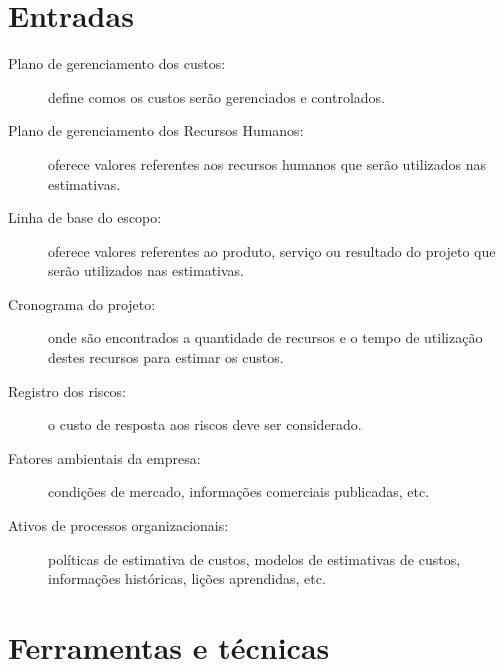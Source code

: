 \section{Entradas}

\begin{description}

	\item[Plano de gerenciamento dos custos:] define comos os custos serão gerenciados e controlados.

	\item[Plano de gerenciamento dos Recursos Humanos:] oferece valores referentes aos recursos humanos que serão utilizados nas estimativas.

	\item[Linha de base do escopo:] oferece valores referentes ao produto, serviço ou resultado do projeto que serão utilizados nas estimativas.

	\item[Cronograma do projeto:] onde são encontrados a quantidade de recursos e o tempo de utilização destes recursos para estimar os custos.

	\item[Registro dos riscos:] o custo de resposta aos riscos deve ser considerado.
	
	\item[Fatores ambientais da empresa:] condições de mercado, informações comerciais publicadas, etc.
	
	\item[Ativos de processos organizacionais:] políticas de estimativa de custos, modelos de estimativas de custos, informações históricas, lições aprendidas, etc.
	
\end{description}

\section{Ferramentas e técnicas}

